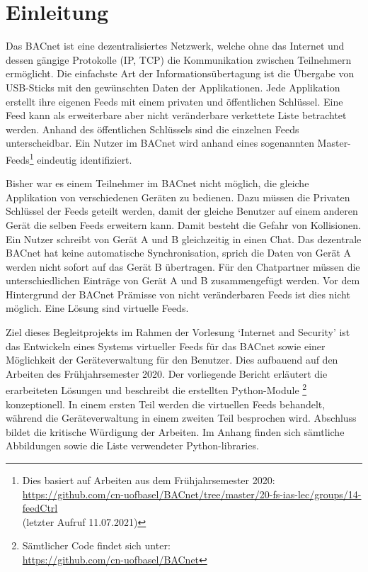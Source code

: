 \documentclass[a4paper,titlepage]{article}
\begin{document}
\section{Einleitung}

Das BACnet ist eine dezentralisiertes Netzwerk, welche ohne das Internet und dessen gängige Protokolle (IP, TCP) die Kommunikation zwischen Teilnehmern ermöglicht. Die einfachste Art der Informationsübertagung ist die Übergabe von USB-Sticks mit den gewünschten Daten der Applikationen. Jede Applikation erstellt ihre eigenen Feeds mit einem privaten und öffentlichen Schlüssel. Eine Feed kann als erweiterbare aber nicht veränderbare verkettete Liste betrachtet werden. Anhand des öffentlichen Schlüssels sind die einzelnen Feeds unterscheidbar. Ein Nutzer im BACnet wird anhand eines sogenannten Master-Feeds\footnote{Dies basiert auf Arbeiten aus dem Frühjahrsemester 2020: \\ \url{https://github.com/cn-uofbasel/BACnet/tree/master/20-fs-ias-lec/groups/14-feedCtrl} \\ (letzter Aufruf 11.07.2021)} eindeutig identifiziert.

Bisher war es einem Teilnehmer im BACnet nicht möglich, die gleiche Applikation von verschiedenen Geräten zu bedienen. Dazu müssen die Privaten Schlüssel der Feeds geteilt werden, damit der gleiche Benutzer auf einem anderen Gerät die selben Feeds erweitern kann. Damit besteht die Gefahr von Kollisionen. Ein Nutzer schreibt von Gerät A und B gleichzeitig in einen Chat. Das dezentrale BACnet hat keine automatische Synchronisation, sprich die Daten von Gerät A werden nicht sofort auf das Gerät B übertragen. Für den Chatpartner müssen die unterschiedlichen Einträge von Gerät A und B zusammengefügt werden. Vor dem Hintergrund der BACnet Prämisse von nicht veränderbaren Feeds ist dies nicht möglich. Eine Lösung sind virtuelle Feeds.

Ziel dieses Begleitprojekts im Rahmen der Vorlesung `Internet and Security' ist das Entwickeln eines Systems virtueller Feeds für das BACnet sowie einer Möglichkeit der Geräteverwaltung für den Benutzer. Dies aufbauend auf den Arbeiten des Frühjahrsemester 2020. Der vorliegende Bericht erläutert die erarbeiteten Lösungen und beschreibt die erstellten Python-Module \footnote{Sämtlicher Code findet sich unter: \\ \url{https://github.com/cn-uofbasel/BACnet}} konzeptionell. In einem ersten Teil werden die virtuellen Feeds behandelt, während die Geräteverwaltung in einem zweiten Teil besprochen wird. Abschluss bildet die kritische Würdigung der Arbeiten. Im Anhang finden sich sämtliche Abbildungen sowie die Liste verwendeter Python-libraries.
\end{document}
